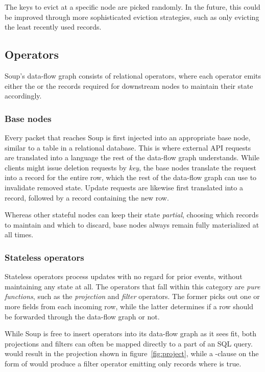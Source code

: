 The keys to evict at a specific node are picked randomly. In the future, this
could be improved through more sophisticated eviction strategies, such as only
evicting the least recently used records.

\subsection{Operators}

Soup's data-flow graph consists of relational operators, where each operator
emits either the  or the  records required for
downstream nodes to maintain their state accordingly.

\subsubsection{Base nodes}

Every packet that reaches Soup is first injected into an appropriate base node,
similar to a table in a relational database. This is where external API requests
are translated into a language the rest of the data-flow graph understands.
While clients might issue \eg deletion requests by \textit{key}, the base nodes
translate the request into a  record for the entire row, which
the rest of the data-flow graph can use to invalidate removed state. Update
requests are likewise first translated into a  record, followed
by a  record containing the new row.

Whereas other stateful nodes can keep their state \textit{partial}, choosing
which records to maintain and which to discard, base nodes always remain fully
materialized at all times.

\subsubsection{Stateless operators}

Stateless operators process updates with no regard for prior events, without
maintaining any state at all. The operators that fall within this category are
\textit{pure functions}, such as the \textit{projection} and \textit{filter}
operators. The former picks out one or more fields from each incoming row, while
the latter determines if a row should be forwarded through the data-flow graph
or not.

While Soup is free to insert operators into its data-flow graph as it sees fit,
both projections and filters can often be mapped directly to a part of an SQL
query.  would result in the projection shown in
figure~\ref{fig:project}, while a -clause on the form of  would produce a filter operator emitting only records where  is true.

